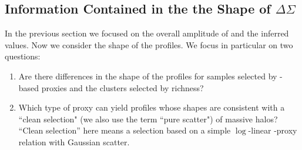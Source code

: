 \documentclass[fleqn,usenatbib,useAMS]{mnras}
\begin{document}
\subsection{Information Contained in the the Shape of \texorpdfstring{$\Delta\Sigma$}{DSigma}}
    \label{sec:mstar_vs_richness}

    In the previous section we focused on the overall amplitude of \dsigma{} and the inferred
    \sigmvir{} values. 
    Now we consider the shape of the \dsigma{} profiles. 
    We focus in particular on two questions:

    \begin{enumerate}

        \item Are there differences in the shape of the \dsigma{} profiles for samples selected by
            \mstar{}-based \mvir{} proxies and the clusters selected by richness?

        \item Which type of \mvir{} proxy can yield \dsigma{} profiles whose shapes are consistent
            with a ``clean selection" (we also use the term ``pure scatter") of massive halos? 
            ``Clean selection'' here means a selection based on a simple $\log$-linear \mvir{}-proxy 
            relation with Gaussian scatter.

    \end{enumerate}
\end{document}
